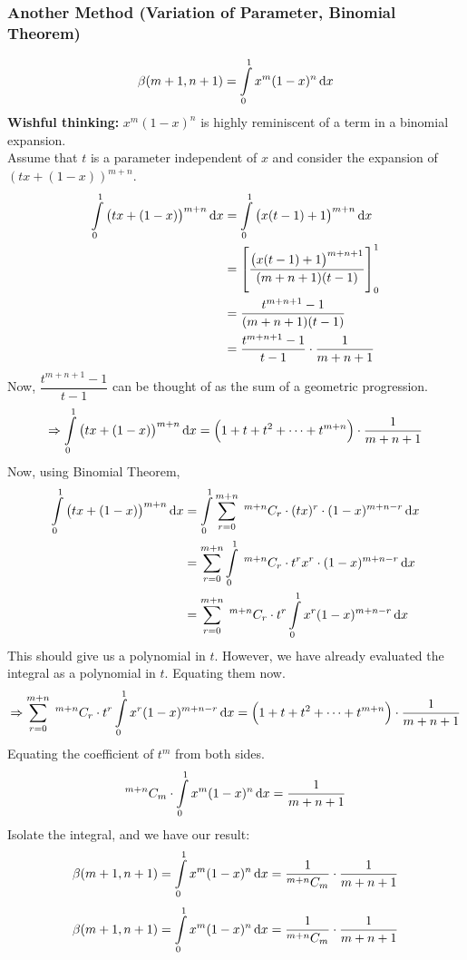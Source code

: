 \documentclass[14]{article}
\theoremstyle{definition}
\theoremstyle{case}
\begin{document}
\subsubsection*{Another Method (Variation of Parameter, Binomial Theorem)}
\[\beta(m+1, n+1) = \int\limits_0^1 x^m (1-x)^n \dif x\]
\textbf{Wishful thinking: }$x^m (1-x)^n$ is highly reminiscent of a term in a binomial expansion.\\
Assume that $t$ is a parameter independent of $x$ and consider the expansion of $\left(tx + (1-x) \right)^{m+n}$.
\begin{align*}
\int\limits_0^1 \left(tx + (1-x) \right)^{m+n} \dif x &= \int\limits_0^1 \left( x(t-1) + 1 \right)^{m+n} \dif x\\
&= \left[ \dfrac{ \left(x(t-1) + 1 \right)^{m+n+1} }{(m+n+1)(t-1)} \right]_0^1\\
&=\dfrac{t^{m+n+1} - 1}{(m+n+1)(t-1)}\\
&= \dfrac{t^{m+n+1} - 1}{t-1} \cdot \dfrac1{m+n+1}
\end{align*}
Now, $\dfrac{t^{m+n+1} - 1}{t-1}$ can be thought of as the sum of a geometric progression.
\[\Rightarrow \int\limits_0^1 \left(tx + (1-x) \right)^{m+n} \dif x = \left(1 + t + t^2 + \cdots + t^{m+n} \right)\cdot \dfrac1{m+n+1}\]
Now, using Binomial Theorem,
\begin{align*}
\int\limits_0^1 \left(tx + (1-x) \right)^{m+n} \dif x &= \int\limits_0^1 \sum\limits_{r=0}^{m+n} \; ^{m+n}C_r \cdot (tx)^r \cdot (1-x)^{m+n-r} \dif x\\
&= \sum\limits_{r=0}^{m+n} \int\limits_0^1 \; ^{m+n}C_r \cdot t^r x^r \cdot (1-x)^{m+n-r} \dif x\\
&= \sum\limits_{r=0}^{m+n} \; ^{m+n}C_r \cdot t^r \int\limits_0^1 x^r (1-x)^{m+n-r} \dif x
\end{align*}
This should give us a polynomial in $t$. However, we have already evaluated the integral as a polynomial in $t$. Equating them now.
\[\Rightarrow \sum\limits_{r=0}^{m+n} \; ^{m+n}C_r \cdot t^r \int\limits_0^1 x^r (1-x)^{m+n-r} \dif x = \left(1 + t + t^2 + \cdots + t^{m+n} \right)\cdot \dfrac1{m+n+1}\]
Equating the coefficient of $t^m$ from both sides.
\[^{m+n}C_m \cdot \int\limits_0^1 x^m (1-x)^{n} \dif x = \dfrac1{m+n+1}\]
Isolate the integral, and we have our result:
\[\beta(m+1, n+1) = \int\limits_0^1 x^m (1-x)^n \dif x = \dfrac1{^{m+n}C_m}\cdot\dfrac1{m+n+1}\]
\pagebreak
\[\beta(m+1, n+1)=\int\limits_0^1 x^m (1-x)^n \dif x = \dfrac1{^{m+n}C_m}\cdot\dfrac1{m+n+1}\]
\end{document}
